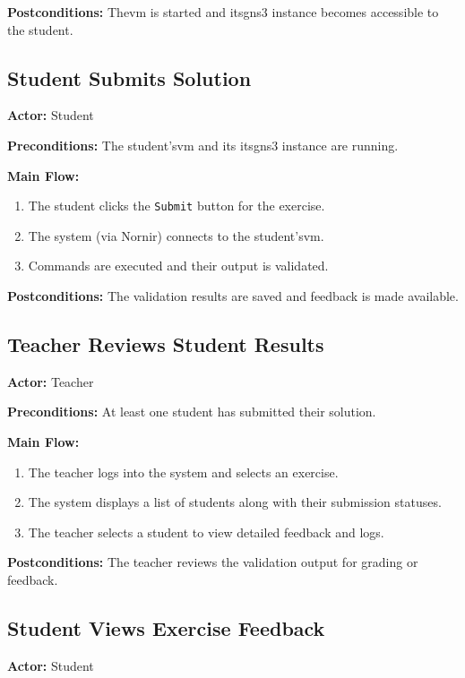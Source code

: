         \textbf{Postconditions:} The\ac{vm} is started and its\ac{gns3} instance becomes accessible to the student.

    \subsection{Student Submits Solution}
        \textbf{Actor:} Student

        \textbf{Preconditions:} The student's\ac{vm} and its its\ac{gns3} instance are running.

        \textbf{Main Flow:}
        \begin{enumerate}
            \item The student clicks the \texttt{Submit} button for the exercise.
            \item The system (via Nornir) connects to the student's\ac{vm}.
            \item Commands are executed and their output is validated.
        \end{enumerate}

        \textbf{Postconditions:} The validation results are saved and feedback is made available.

    \subsection{Teacher Reviews Student Results}
        \textbf{Actor:} Teacher

        \textbf{Preconditions:} At least one student has submitted their solution.

        \textbf{Main Flow:}
        \begin{enumerate}
            \item The teacher logs into the system and selects an exercise.
            \item The system displays a list of students along with their submission statuses.
            \item The teacher selects a student to view detailed feedback and logs.
        \end{enumerate}

        \textbf{Postconditions:} The teacher reviews the validation output for grading or feedback.

    \subsection{Student Views Exercise Feedback}
        \textbf{Actor:} Student

